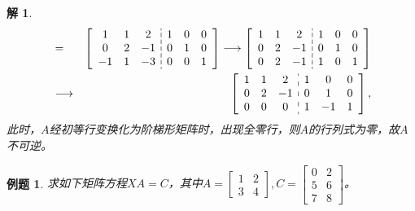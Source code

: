 \documentclass[a4paper]{book}
\newtheorem{eg}{例题}[chapter]
\newtheorem*{solution}{解}
\begin{document}
\begin{solution}
\begin{eqnarray*}
[A,I] & = &
  \setlength{\dashlinegap}{2pt}
  \left[ \begin{array}{ccc:ccc}
    1 & 1 & 2 & 1 & 0 & 0 \\ 0 & 2 & -1 & 0 & 1 & 0 \\ -1 & 1 & -3 & 0 & 0 & 1
  \end{array} \right] \longrightarrow
  \left[ \begin{array}{ccc:ccc}
     1 & 1 & 2 & 1 & 0 & 0 \\ 0 & 2 & -1 & 0 & 1 & 0 \\ 0 & 2 & -1 & 1 & 0 & 1
  \end{array} \right] \\
  & \longrightarrow & \left[ \begin{array}{ccc:ccc}
      1 & 1 & 2 & 1 & 0 & 0 \\ 0 & 2 & -1 & 0 & 1 & 0 \\ 0 & 0 & 0 & 1 & -1 & 1
   \end{array} \right],
\end{eqnarray*}
此时，$A$经初等行变换化为阶梯形矩阵时，出现全零行，则$A$的行列式为零，故$A$不可逆。
\end{solution}

\begin{eg}
求如下矩阵方程$XA=C$，其中$A = \begin{bmatrix} 1 & 2 \\ 3 & 4 \end{bmatrix}, C = \begin{bmatrix} 0 & 2 \\ 5 & 6 \\ 7 & 8 \end{bmatrix}$。
\end{eg}
\end{document}
